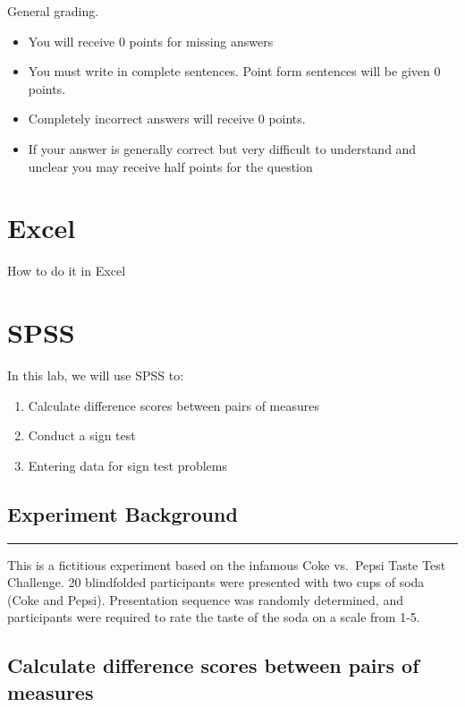 \documentclass[]{book}
\providecommand{\tightlist}{%
  \setlength{\itemsep}{0pt}\setlength{\parskip}{0pt}}
\begin{document}
General grading.

\begin{itemize}
\tightlist
\item
  You will receive 0 points for missing answers
\item
  You must write in complete sentences. Point form sentences will be
  given 0 points.
\item
  Completely incorrect answers will receive 0 points.
\item
  If your answer is generally correct but very difficult to understand
  and unclear you may receive half points for the question
\end{itemize}

\section{Excel}\label{excel-5}

How to do it in Excel

\section{SPSS}\label{spss-5}

In this lab, we will use SPSS to:

\begin{enumerate}
\def\labelenumi{\arabic{enumi}.}
\tightlist
\item
  Calculate difference scores between pairs of measures
\item
  Conduct a sign test
\item
  Entering data for sign test problems
\end{enumerate}

\subsection{Experiment Background}\label{experiment-background}

\begin{center}\rule{0.5\linewidth}{0.5pt}\end{center}

This is a fictitious experiment based on the infamous Coke vs.~Pepsi
Taste Test Challenge. 20 blindfolded participants were presented with
two cups of soda (Coke and Pepsi). Presentation sequence was randomly
determined, and participants were required to rate the taste of the soda
on a scale from 1-5.

\subsection{Calculate difference scores between pairs of
measures}\label{calculate-difference-scores-between-pairs-of-measures}
\end{document}
